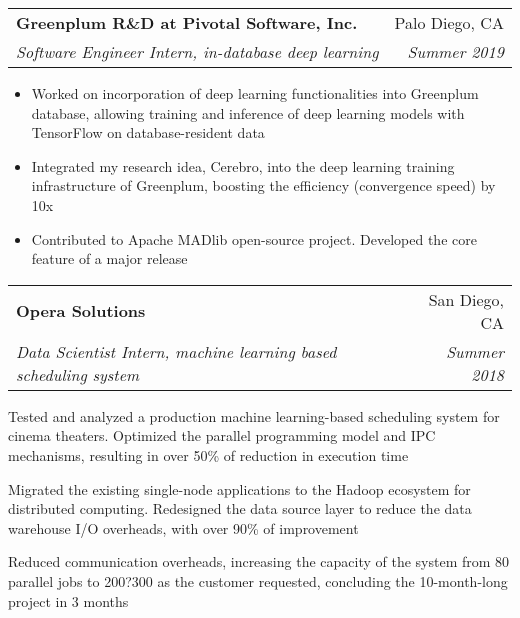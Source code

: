 \documentclass[letterpaper,11pt]{article}
\makeatletter
\newcommand{\resumeItem}[2]{
  \item\small{
    \textbf{#1}{: #2 \vspace{-2pt}}
  }
}
\newcommand{\resumeSubheading}[4]{
  \vspace{-1pt}\item
    \begin{tabular*}{0.97\textwidth}[t]{l@{\extracolsep{\fill}}r}
      \textbf{#1} & #2 \\
      \textit{\small#3} & \textit{\small #4}
    \end{tabular*}\vspace{-5pt}
}
\newcommand{\resumeItemListStart}{\begin{itemize}}
\newcommand{\resumeItemListEnd}{\end{itemize}\vspace{-5pt}}
\makeatother
\begin{document}
    \resumeSubheading
      {Greenplum R\&D at Pivotal Software, Inc.}{Palo Diego, CA}
      {Software Engineer Intern, in-database deep learning}{Summer 2019}
      \resumeItemListStart
       \item {\small Worked on incorporation of deep learning functionalities into Greenplum database, allowing training and inference of deep learning models with TensorFlow on database-resident data \vspace{-2pt}}
       \item {\small Integrated my research idea, Cerebro, into the deep learning training infrastructure of Greenplum, boosting the efficiency (convergence speed) by 10x \vspace{-2pt}}
       \item {\small Contributed to Apache MADlib open-source project. Developed the core feature of a major release \vspace{-2pt}}
      \resumeItemListEnd
      
      
      
    \resumeSubheading
      {Opera Solutions}{San Diego, CA}
      {Data Scientist Intern, machine learning based scheduling system}{Summer 2018}
      \resumeItemListStart
      {\small
        \item Tested and analyzed a production machine learning-based scheduling system for cinema theaters. Optimized the parallel programming model and IPC mechanisms, resulting in over 50\% of reduction in execution time \vspace{-2pt}
       \item Migrated the existing single-node applications to the Hadoop ecosystem for distributed computing. Redesigned the data source layer to reduce the data warehouse I/O overheads, with over 90\% of improvement \vspace{-2pt}
       \item Reduced communication overheads, increasing the capacity of the system from 80 parallel jobs to 200?300 as the customer requested, concluding the 10-month-long project in 3 months \vspace{-2pt}
       }
      \resumeItemListEnd



\end{document}
